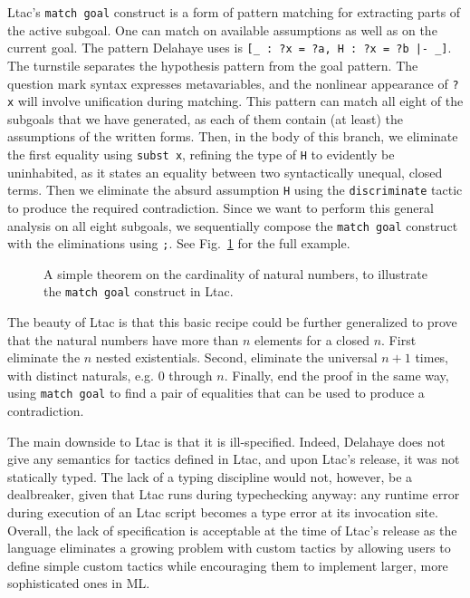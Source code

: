 Ltac's \texttt{match goal} construct is a form of pattern matching for
extracting parts of the active subgoal.
One can match on available assumptions as well as on the current goal.
The pattern Delahaye uses is \texttt{[_ : ?x = ?a, H : ?x = ?b |- _]}.
The turnstile separates the hypothesis pattern from the goal pattern.
The question mark syntax expresses metavariables, and the nonlinear appearance
of \texttt{?x} will involve unification during matching.
This pattern can match all eight of the subgoals that we have generated, as
each of them contain (at least) the assumptions of the written forms.
Then, in the body of this branch, we eliminate the first equality using
\texttt{subst x}, refining the type of \texttt{H} to evidently be uninhabited,
as it states an equality between two syntactically unequal, closed terms.
Then we eliminate the absurd assumption \texttt{H} using the
\texttt{discriminate} tactic to produce the required contradiction.
Since we want to perform this general analysis on all eight subgoals, we
sequentially compose the \texttt{match goal} construct with the eliminations
using \texttt{;}.
See Fig.~\ref{fig:ltac-example} for the full example.

\begin{figure}[t]
  \caption{%
    A simple theorem on the cardinality of natural numbers, to illustrate the
    \texttt{match goal} construct in Ltac.%
  }
  \label{fig:ltac-example}
\end{figure}

The beauty of Ltac is that this basic recipe could be further generalized to
prove that the natural numbers have more than $n$ elements for a closed $n$.
First eliminate the $n$ nested existentials. Second, eliminate the universal
$n + 1$ times, with distinct naturals, e.g. $0$ through $n$.
Finally, end the proof in the same way, using \texttt{match goal} to find a pair
of equalities that can be used to produce a contradiction.

The main downside to Ltac is that it is ill-specified.
Indeed, Delahaye does not give any semantics for tactics defined in
Ltac, and upon Ltac's release, it was not statically typed.
The lack of a typing discipline would not, however, be a dealbreaker, given that
Ltac runs during typechecking anyway:
any runtime error during execution of an Ltac script becomes a
type error at its invocation site.
Overall, the lack of specification is acceptable at the time of Ltac's release
as the language eliminates a growing problem with custom tactics by allowing
users to define simple custom tactics while encouraging them to implement
larger, more sophisticated ones in ML.

